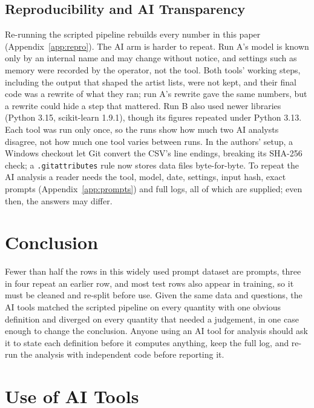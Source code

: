 \documentclass[conference]{IEEEtran}
\begin{document}
\subsection{Reproducibility and AI Transparency}
Re-running the scripted pipeline rebuilds every number in this paper
(Appendix~\ref{app:repro}). The AI arm is harder to repeat. Run A's model
is known only by an internal name and may change without notice, and
settings such as memory were recorded by the operator, not the tool. Both
tools' working steps, including the output that shaped the artist lists,
were not kept, and their final code was a rewrite of what they ran; run A's
rewrite gave the same numbers, but a rewrite could hide a step that
mattered. Run B also used newer libraries (Python 3.15, scikit-learn 1.9.1), though
its figures repeated under Python 3.13. Each tool was run only once, so the runs show how much two AI analysts
disagree, not how much one tool varies between runs. In the authors' setup, a Windows checkout let Git convert
the CSV's line endings, breaking its SHA-256 check; a \texttt{.gitattributes}
rule now stores data files byte-for-byte. To repeat the AI analysis a reader
needs the tool, model, date, settings, input hash, exact prompts
(Appendix~\ref{app:prompts}) and full logs, all of which are supplied; even then, the
answers may differ.

\section{Conclusion}

Fewer than half the rows in this widely used prompt dataset are prompts,
three in four repeat an earlier row, and most test rows also appear in
training, so it must be cleaned and re-split before use. Given the same data
and questions, the AI tools matched the scripted pipeline on every quantity with one
obvious definition and diverged on every quantity that needed a judgement,
in one case enough to change the conclusion. Anyone using an AI tool for analysis should ask it to state each
definition before it computes anything, keep the full log, and re-run the
analysis with independent code before reporting it.

\section*{Use of AI Tools}
\end{document}
